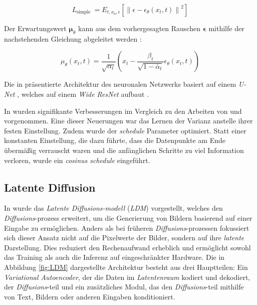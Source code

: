\documentclass[
  a4paper,  %
  twoside,  %
  bibliography=totoc,
  headsepline,
  cleardoublepage=empty,
  parskip=half,
  draft=false
]{scrbook}
\begin{document}
\begin{equation}
    L_{\text {simple }}=E_{t, x_0, \epsilon}\left[\left\|\epsilon-\epsilon_\theta\left(x_t, t\right)\right\|^2\right]
\end{equation}

Der Erwartungswert $\boldsymbol{\mu}_\theta$ kann aus dem vorhergesagten Rauschen $\boldsymbol{\epsilon}$ mithilfe der nachstehenden Gleichung abgeleitet werden \cite{ho_denoising_2020}:

\begin{equation}
    \mu_\theta\left(x_t, t\right)=\frac{1}{\sqrt{\alpha_t}}\left(x_t-\frac{\beta_t}{\sqrt{1-\bar{\alpha}_t}} \epsilon_\theta\left(x_t, t\right)\right)
\end{equation}

Die in \cite{ho_denoising_2020} präsentierte Architektur des neuronalen Netzwerks basiert auf einem \emph{U-Net} \cite{ronneberger_u-net_2015}, welches auf einem \emph{Wide ResNet} \cite{zagoruyko_wide_2017} aufbaut \cite{ho_denoising_2020}.

In \cite{nichol_improved_2021} wurden signifikante Verbesserungen im Vergleich zu den Arbeiten von \cite{sohl-dickstein_deep_2015} und \cite{ho_denoising_2020} vorgenommen. Eine dieser Neuerungen war das Lernen der Varianz anstelle ihrer festen Einstellung. Zudem wurde der \emph{schedule} Parameter optimiert. Statt einer konstanten Einstellung, die dazu führte, dass die Datenpunkte am Ende übermäßig verrauscht waren und die anfänglichen Schritte zu viel Information verloren, wurde ein \emph{cosinus schedule} eingeführt. \cite{nichol_improved_2021}

\subsection{Latente Diffusion}

In \cite{rombach_high-resolution_2022} wurde das \emph{Latente \emph{Diffusions}-modell} (\emph{LDM}) vorgestellt, welches den \emph{Diffusions}-prozess \cite{sohl-dickstein_deep_2015, ho_denoising_2020, nichol_improved_2021, dhariwal_diffusion_2021} erweitert, um die Generierung von Bildern basierend auf einer Eingabe zu ermöglichen. Anders als bei früheren \emph{Diffusions}-prozessen fokussiert sich dieser Ansatz nicht auf die Pixelwerte der Bilder, sondern auf ihre \emph{latente} Darstellung. Dies reduziert den Rechenaufwand erheblich und ermöglicht sowohl das Training als auch die Inferenz auf eingeschränkter Hardware. Die in Abbildung \ref{fig:LDM} dargestellte Architektur besteht aus drei Hauptteilen: Ein \emph{Variational Autoencoder}, der die Daten im \emph{Latentenraum} kodiert und dekodiert, der \emph{Diffusions}-teil und ein zusätzliches Modul, das den \emph{Diffusions}-teil mithilfe von Text, Bildern oder anderen Eingaben konditioniert. \cite{rombach_high-resolution_2022}
\end{document}
